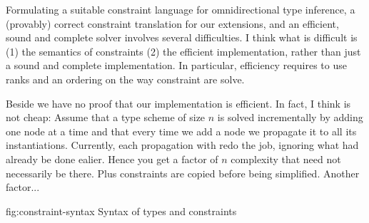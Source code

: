 \documentclass[acmsmall,screen,nonacm]{acmart}
\begin{document}
\begin{version}{}
Formulating a suitable constraint language for omnidirectional type
inference, a (provably) correct constraint translation for our extensions,
and an efficient, sound and complete solver involves several difficulties.
\Xdidier
{I think what is difficult is (1) the semantics of constraints (2) the
efficient implementation, rather than just a sound and complete
implementation. In particular, efficiency requires to use ranks and an
ordering on the way constraint are solve.}

\Xdidier
{Beside we have no proof that our implementation is efficient. In fact, I
think is not cheap: Assume that a type scheme of size $n$ is solved
incrementally by adding one node at a time and that every time we add a node
we propagate it to all its instantiations. Currently, each propagation with
redo the job, ignoring what had already be done ealier. Hence you get a
factor of $n$ complexity that need not necessarily be there. Plus
constraints are copied before being simplified. Another factor...}


\end{version}

\begin{bnffig}[t]%
  {fig:constraint-syntax}%
  {Syntax of types and constraints}
\\
\\
\\
\entry[Constraints]{\C}{
        \ctrue
  \and  \cfalse
  \and  \Cone \cand \Ctwo
  \and  \cexists \cv \c
  \and 	\cfor \tv \c
  \and  \cunif \tone \ttwo
  \nextline
  \and  \cletin \x {\clam \cv \Cone} {\Ctwo}
  \and  \cinst \x \t
  \nextline
  \and  \cmatch \t  \D  \hf
}\\
\entry[Shapes] \sh {\tvs \F \and \ldots}
\\
 \D {\eset \and \D, \tv \and \D, \x}
\end{bnffig}
\end{document}
